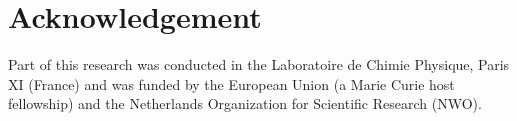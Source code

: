\section*{Acknowledgement}

Part of this research was conducted in the Laboratoire de Chimie Physique, Paris XI (France) and was funded by the European Union (a Marie Curie host fellowship) and the Netherlands Organization for Scientific Research (NWO).



